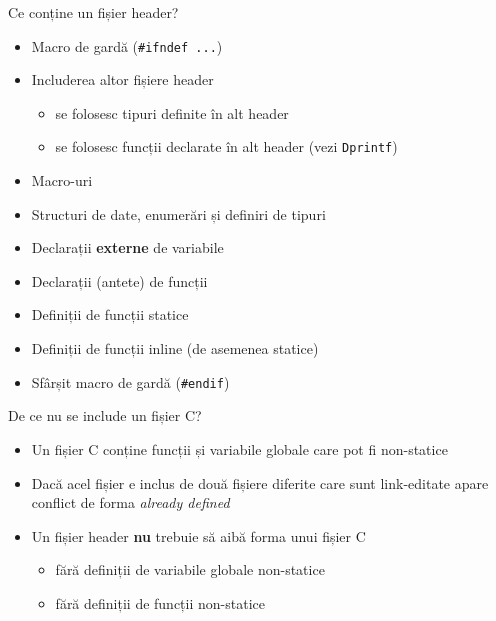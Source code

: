 \documentclass{beamer}
\begin{document}
\begin{frame}{Ce conține un fișier header?}
	\begin{itemize}
		\pause \item Macro de gardă (\texttt{\#ifndef ...})
		\pause \item Includerea altor fișiere header
			\begin{itemize}
				\item se folosesc tipuri definite în alt header
				\item se folosesc funcții declarate în alt header (vezi \texttt{Dprintf})
			\end{itemize}
		\pause \item Macro-uri
		\pause \item Structuri de date, enumerări și definiri de tipuri
		\pause \item Declarații \textbf{externe} de variabile
		\pause \item Declarații (antete) de funcții
		\pause \item Definiții de funcții statice
		\pause \item Definiții de funcții inline (de asemenea statice)
		\pause \item Sfârșit macro de gardă (\texttt{\#endif})
	\end{itemize}
\end{frame}

\begin{frame}{De ce nu se include un fișier C?}
	\begin{itemize}
		\item Un fișier C conține funcții și variabile globale care pot fi non-statice
		\item Dacă acel fișier e inclus de două fișiere diferite care sunt
link-editate apare conflict de forma \textit{already defined}
		\item Un fișier header \textbf{nu} trebuie să aibă forma unui fișier C
			\begin{itemize}
				\item fără definiții de variabile globale non-statice
				\item fără definiții de funcții non-statice
			\end{itemize}
	\end{itemize}
\end{frame}
\end{document}
